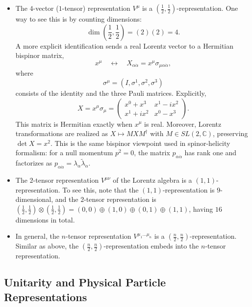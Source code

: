\begin{example}
\label{ex:spinors-bispinors}
    \begin{itemize}
        \item The $4$-vector ($1$-tensor) representation $V^\mu$ is a $(\frac{1}{2}, \frac{1}{2})$-representation. One way to see this is by counting dimensions:
        \[
            \dim\left(\frac{1}{2},\frac{1}{2}\right) = (2)(2) = 4.
        \]
        A more explicit identification sends a real Lorentz vector to a Hermitian bispinor matrix,
        \[
            x^\mu \quad \longleftrightarrow \quad X_{\alpha\dot\alpha} = x^\mu \sigma_{\mu\alpha\dot\alpha},
        \]
        where
        \[
            \sigma^\mu = (I, \sigma^1, \sigma^2, \sigma^3)
        \]
        consists of the identity and the three Pauli matrices. Explicitly,
        \[
            X = x^\mu \sigma_\mu =
            \begin{pmatrix}
                x^0+x^3 & x^1-i x^2 \\
                x^1+i x^2 & x^0-x^3
            \end{pmatrix}.
        \]
        This matrix is Hermitian exactly when $x^\mu$ is real. Moreover, Lorentz transformations are realized as $X \mapsto M X M^\dagger$ with $M \in SL(2,\mathbb{C})$, preserving $\det X = x^2$. This is the same bispinor viewpoint used in spinor-helicity formalism: for a null momentum $p^2=0$, the matrix $p_{\alpha\dot\alpha}$ has rank one and factorizes as $p_{\alpha\dot\alpha}=\lambda_\alpha \tilde\lambda_{\dot\alpha}$.
        \item The $2$-tensor representation $V^{\mu \nu}$ of the Lorentz algebra is a $(1,1)$-representation. 
        To see this, note that the $(1,1)$-representation is $9$-dimensional, and the $2$-tensor representation is $(\frac{1}{2}, \frac{1}{2}) \otimes (\frac{1}{2}, \frac{1}{2}) =
    (0,0) \oplus(1,0) \oplus(0,1) \oplus(1,1)$, having $16$ dimensions in total.
        \item In general, the $n$-tensor representation $V^{\mu_1 \ldots \mu_n}$ is a $(\frac{n}{2}, \frac{n}{2})$-representation.
        Similar as above, the $(\frac{n}{2}, \frac{n}{2})$-representation embeds into the $n$-tensor representation.
    \end{itemize}
\end{example}

\subsection{Unitarity and Physical Particle Representations}
\label{subsec:unitarity-and-physical-particle-representations}

